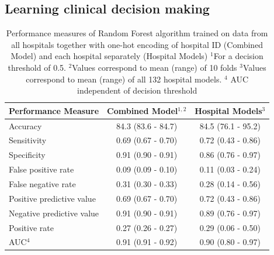 \documentclass[12pt,a4paper, pdftex]{elsarticle}
\newcommand{\crjFIXME}[1]{\textcolor{blue}{[\textbf{FIXME} \textsl{#1}]}}
\begin{document}
\subsection{Learning clinical decision making}



    \begin{table}[h!]
        \centering
        \begin{tabular}{|l|c|c|}
        \hline
        {\bf Performance Measure} & {\bf Combined Model$^{1,2}$}  & {\bf Hospital Models$^3$} \\
        \hline
        Accuracy & 84.3 (83.6 - 84.7) & 84.5 (76.1 - 95.2)\\
        Sensitivity & 0.69 (0.67 - 0.70) & 0.72 (0.43 - 0.86)\\
        Specificity & 0.91 (0.90 - 0.91) & 0.86 (0.76 - 0.97)\\
        False positive rate & 0.09 (0.09 - 0.10) & 0.11 (0.03 - 0.24)\\
        False negative rate & 0.31 (0.30 - 0.33) & 0.28 (0.14 - 0.56)\\
        Positive predictive value & 0.69 (0.67 - 0.70) & 0.72 (0.43 - 0.86)\\
        Negative predictive value & 0.91 (0.90 - 0.91) & 0.89 (0.76 - 0.97)\\
        Positive rate & 0.27 (0.26 - 0.27) & 0.29 (0.06 - 0.50)\\
        AUC$^4$ & 0.91 (0.91 - 0.92) & 0.90 (0.80 - 0.97)\\
        \hline
        \end{tabular}
        \caption{Performance measures of Random Forest algorithm trained on data from all hospitals together with one-hot encoding of hospital ID (Combined Model) and each hospital separately (Hospital Models) $^1$For a decision threshold of 0.5. $^2$Values correspond to mean (range) of 10 folds $^3$Values correspond to mean (range) of all 132 hospital models. $^4$ AUC independent of decision threshold}
        \label{tab:2}
    \end{table}
\end{document}
